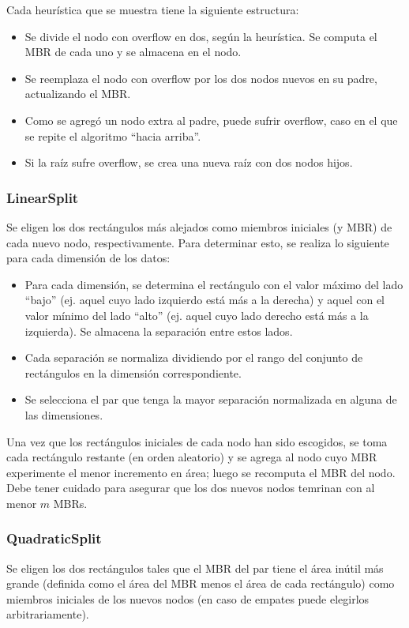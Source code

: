\documentclass[dcc,uchile]{fcfmcourse}
\begin{document}
Cada heurística que se muestra tiene la siguiente estructura:
\begin{itemize}
    \item Se divide el nodo con overflow en dos, según la heurística. Se computa el MBR de cada uno y se almacena en el nodo.
    \item Se reemplaza el nodo con overflow por los dos nodos nuevos en su padre, actualizando el MBR.
    \item Como se agregó un nodo extra al padre, puede sufrir overflow, caso en el que se repite el algoritmo ``hacia arriba''.
    \item Si la raíz sufre overflow, se crea una nueva raíz con dos nodos hijos.
\end{itemize}
\subsubsection{LinearSplit}
Se eligen los dos rectángulos más alejados como miembros iniciales (y MBR) de cada nuevo nodo, respectivamente. Para determinar esto, se realiza lo siguiente para cada dimensión de los datos:
\begin{itemize}
    \item Para cada dimensión, se determina el rectángulo con el valor máximo del lado ``bajo'' (ej. aquel cuyo lado izquierdo está más a la derecha) y aquel con el valor mínimo del lado ``alto'' (ej. aquel cuyo lado derecho está más a la izquierda). Se almacena la separación entre estos lados.
    \item Cada separación se normaliza dividiendo por el rango del conjunto de rectángulos en la dimensión correspondiente.
    \item Se selecciona el par que tenga la mayor separación normalizada en alguna de las dimensiones.
\end{itemize}
Una vez que los rectángulos iniciales de cada nodo han sido escogidos, se toma cada rectángulo restante (en orden aleatorio) y se agrega al nodo cuyo MBR experimente el menor incremento en área; luego se recomputa el MBR del nodo. Debe tener cuidado para asegurar que los dos nuevos nodos temrinan con al menor $m$ MBRs.
\subsubsection{QuadraticSplit}
Se eligen los dos rectángulos tales que el MBR del par tiene el área inútil más grande (definida como el área del MBR menos el área de cada rectángulo) como miembros iniciales de los nuevos nodos (en caso de empates puede elegirlos arbitrariamente).
\end{document}
